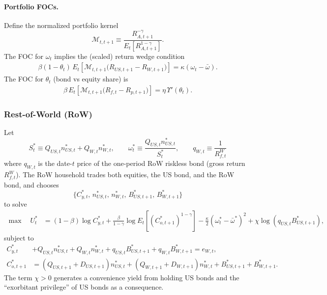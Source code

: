 \documentclass[12pt]{article}
\theoremstyle{plain}
\begin{document}
\paragraph{Portfolio FOCs.}
Define the normalized portfolio kernel
\[
\mathcal M_{t,t+1} \equiv \frac{R_{A,t+1}^{-\gamma}}{E_t\!\left[R_{A,t+1}^{1-\gamma}\right]}.
\]
The FOC for $\omega_t$ implies the (scaled) return wedge condition
\begin{align}\label{US_omega_FOC_bond_cost}
\beta(1-\theta_t)\,E_t\!\left[\mathcal M_{t,t+1}\bigl(R_{US,t+1}-R_{W,t+1}\bigr)\right]
=\kappa(\omega_t-\bar\omega).
\end{align}
The FOC for $\theta_t$ (bond vs equity share) is
\begin{align}\label{US_theta_FOC_bond_cost}
\beta\,E_t\!\left[\mathcal M_{t,t+1}\bigl(R_{f,t}-R_{p,t+1}\bigr)\right]
=\eta\,\Upsilon'(\theta_t).
\end{align}

\subsubsection{Rest-of-World (RoW)}

Let
\[
S_t^* \equiv Q_{US,t}n^*_{US,t}+Q_{W,t}n^*_{W,t},
\qquad
\omega_t^* \equiv \frac{Q_{US,t}n^*_{US,t}}{S_t^*},
\qquad
q_{W,t}\equiv \frac{1}{R_{f,t}^W}
\]
where $q_{W,t}$ is the date-$t$ price of the one-period RoW riskless bond (gross return $R_{f,t}^W$).
The RoW household trades both equities, the US bond, and the RoW bond, and chooses
\[
\{C^*_{y,t},\,n^*_{US,t},\,n^*_{W,t},\,B^*_{US,t+1},\,B^*_{W,t+1}\}
\]
to solve
\begin{align*}
\max\quad U_t^*
&=
(1-\beta)\log C^*_{y,t}
+\frac{\beta}{1-\gamma}\log E_t\!\left[\left(C^*_{o,t+1}\right)^{1-\gamma}\right]
-\frac{\kappa}{2}\left(\omega_t^*-\bar\omega^*\right)^2
+\chi\log\!\left(q_{US,t}B^*_{US,t+1}\right),
\end{align*}
subject to
\begin{align*}
C^*_{y,t}
&+Q_{US,t}n^*_{US,t}+Q_{W,t}n^*_{W,t}
+q_{US,t}B^*_{US,t+1}+q_{W,t}B^*_{W,t+1}
= e_{W,t},\\
C^*_{o,t+1}
&=
(Q_{US,t+1}+D_{US,t+1})n^*_{US,t}
+(Q_{W,t+1}+D_{W,t+1})n^*_{W,t}
+B^*_{US,t+1}+B^*_{W,t+1}.
\end{align*}
The term $\chi>0$ generates a convenience yield from holding US bonds and the ``exorbitant privilege'' of US bonds as a consequence.
\end{document}
